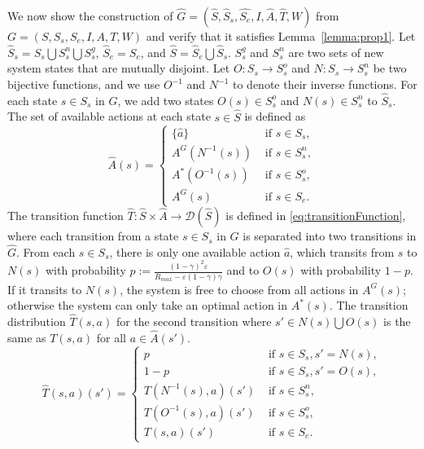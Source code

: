 \documentclass[runningheads,a4paper]{llncs}
\begin{document}
We now show the construction of $\hat{G} = (\hat{S}, \hat{S}_s, \hat{S_e}, I, \hat{A}, \hat{T}, W)$ from $G = (S, S_s, S_e, I, A, T, W)$ and verify that it satisfies Lemma~\ref{lemma:prop1}. 
Let $\hat{S}_s = S_s \bigcup S_s^n \bigcup S_s^g$, $\hat{S}_e = S_e$, and $\hat{S} = \hat{S}_e \bigcup \hat{S}_s$. $S_s^g$ and $S_s^n$ are two sets of new system states that are mutually disjoint. Let $O: S_s \rightarrow S_s^o$ and $N: S_s \rightarrow S_s^n$ be two bijective functions, and we use $O^{-1}$ and $N^{-1}$ to denote their inverse functions. For each state $s \in S_s$ in $G$, we add two states $O(s) \in S_s^o$ and $N(s) \in S_s^n$ to $\hat{S}_s$. 
The set of available actions at each state $s \in \hat{S}$ is defined as
\begin{equation}
\hat{A}(s) = 
\begin{cases}
\{\hat{a}\} &\text{ if }s \in S_s, \\
A^G(N^{-1}(s)) &\text{ if }s \in S_s^n, \\
A^*(O^{-1}(s)) &\text{ if }s \in S_s^o, \\
A^G(s) &\text{ if }s \in S_e.
\end{cases}
\label{eq:actionSet}
\end{equation}
The transition function $\hat{T}: \hat{S} \times \hat{A} \rightarrow \mathcal{D}(\hat{S})$ is defined  in \eqref{eq:transitionFunction}, where each transition from a state $s \in S_s$ in $G$ is separated into two transitions in $\hat{G}$. From each $s \in S_s$, there is only one available action $\hat{a}$, which transits from $s$ to $N(s)$ with probability $p := \frac{(1-\gamma)^2 \varepsilon}{R_{max} - \varepsilon(1-\gamma)\gamma}$ and to $O(s)$ with probability $1-p$. If it transits to $N(s)$, the system is free to choose from all actions in $A^G(s)$; otherwise the system can only take an optimal action in $A^*(s)$. The transition distribution $\hat{T}(s,a)$ for the second transition where $s' \in N(s) \bigcup O(s)$ is the same as $T(s, a)$ for all $a \in \hat{A}(s')$. 
\begin{equation}
\hat{T}(s,a)(s') = 
\begin{cases}
p &\text{ if }s \in S_s, s'=N(s),\\
1-p &\text{ if }s \in S_s, s'=O(s),\\
T(N^{-1}(s),a)(s') &\text{ if }s \in S_s^n, \\
T(O^{-1}(s),a)(s') &\text{ if }s \in S_s^o, \\
T(s,a)(s') &\text{ if }s \in S_e.
\end{cases}
\label{eq:transitionFunction}
\end{equation}
\end{document}
